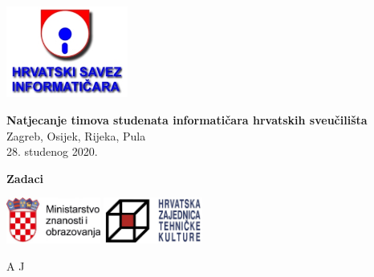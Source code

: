 \documentclass[a4paper]{article}
\begin{document}
\thispagestyle{empty}
\begin{center}
  \includegraphics[height=3cm]{pic/hsin.jpg}
\end{center}
\vspace{1cm}
\begin{center}
  {\Large\textbf{\textsf{Natjecanje timova studenata informatičara hrvatskih sveučilišta}}} \\
  \vspace{.5cm}
  {\large{\textsf{Zagreb, Osijek, Rijeka, Pula}}} \\
  \vspace{.3cm}
  \textsf{28. studenog 2020.}
\end{center}
\vspace{2cm}
\begin{center}
  {\large \textbf{Zadaci}}

  \begin{minipage}{.5\textwidth}
    \renewcommand\contentsname{}
    \tableofcontents
  \end{minipage}
\end{center}
\vspace{5cm}
\begin{center}
  \includegraphics[height=1.5cm]{pic/mzo.jpg}
  \hspace{3cm}
  \includegraphics[height=1.5cm]{pic/hztk.png}
\end{center}
\vspace{\fill}
\clearpage
\setcounter{page}{1}
{A}
{J}
\end{document}
